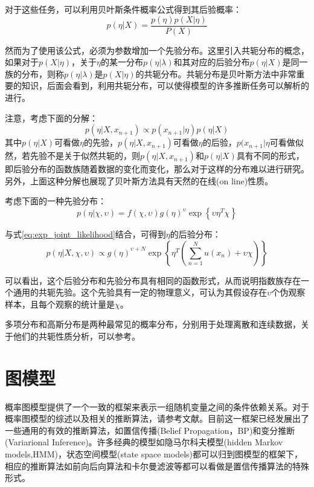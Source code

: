 对于这些任务，可以利用贝叶斯条件概率公式得到其后验概率：
\begin{equation}
p(\eta|X)= \frac{p(\eta)p(X|\eta)}{P(X)}
\end{equation}

然而为了使用该公式，必须为参数增加一个先验分布。这里引入共轭分布的概念，如果对于$p(X|\eta)$，关于$\eta$的某一分布$p(\eta|\lambda)$和其对应的后验分布$p(\eta|X)$是同一族的分布，则称$p(\eta|\lambda)$是$p(X|\eta)$的共轭分布。共轭分布是贝叶斯方法中非常重要的知识，后面会看到，利用共轭分布，可以使得模型的许多推断任务可以解析的进行。

注意，考虑下面的分解：
\begin{equation}
p(\eta|X,x_{n+1}) \propto p(x_{n+1}|\eta) p(\eta|X)
\end{equation}
其中$p(\eta|X)$可看做$\eta$的先验，$p(\eta|X,x_{n+1})$可看做$\eta$的后验，$p(x_{n+1}|\eta$可看做似然，若先验不是关于似然共轭的，则$p(\eta|X,x_{n+1})$和$p(\eta|X)$具有不同的形式，即后验分布的函数族随着数据的变化而变化，那么对于这样的分布难以进行研究。另外，上面这种分解也展现了贝叶斯方法具有天然的在线(on line)性质。

考虑下面的一种先验分布：
\begin{equation}
p(\eta|\chi,\upsilon)  = f(\chi,\upsilon) {g(\eta)}^{\upsilon}\exp{\left\{ \upsilon {\eta}^T \chi \right\} }
\end{equation}

与式\eqref{eq:exp_joint_likelihood}结合，可得到$\eta$的后验分布：
\begin{equation}
p(\eta|X,\chi,\upsilon) \propto {g(\eta)}^{\upsilon+N} \exp{\left\{  \eta^T \left( {\sum_{n=1}^N{u(x_n) + \upsilon \chi} } \right)\right\} }
\end{equation}

可以看出，这个后验分布和先验分布具有相同的函数形式，从而说明指数族存在一个通用的共轭先验。这个先验具有一定的物理意义，可认为其假设存在$\upsilon$个伪观察样本，且每个观察的统计量是$\chi$。

多项分布和高斯分布是两种最常见的概率分布，分别用于处理离散和连续数据，关于他们的共轭性质分析，可以参考\cite{heinrich2005parameter,murphy2007conjugate}。

\section{图模型}
概率图模型提供了一个一致的框架来表示一组随机变量之间的条件依赖关系。对于概率图模型的综述以及相关的推断算法，请参考文献\cite{koller:2009,jordan:2003introduction}。目前这一框架已经发展出了一些通用的有效的推断算法，如置信传播(Belief Propagation，BP)和变分推断(Variarional Inference)。许多经典的模型如隐马尔科夫模型(hidden Markov models,HMM)，状态空间模型(state space models)都可以归到图模型的框架下，相应的推断算法如前向后向算法和卡尔曼滤波等都可以看做是置信传播算法的特殊形式。

